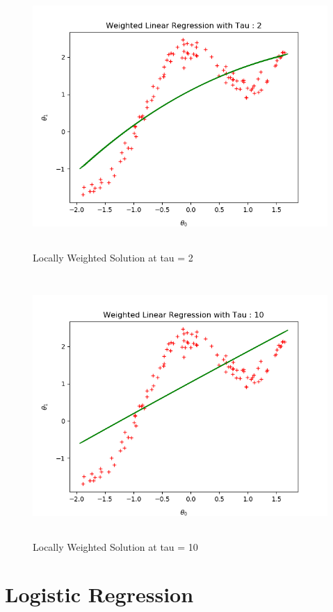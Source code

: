 \documentclass[10pt]{article}
\begin{document}
\begin{figure}[H]
	\includegraphics[width = 15cm,height = 10cm]{Q2_b2}
	\caption{Locally Weighted Solution at tau = 2}
\end{figure}

\begin{figure}[H]
	\includegraphics[width = 15cm,height = 10cm]{Q2_b10}
	\caption{Locally Weighted Solution at tau = 10}
\end{figure}
 

\section{Logistic Regression}
\end{document}
